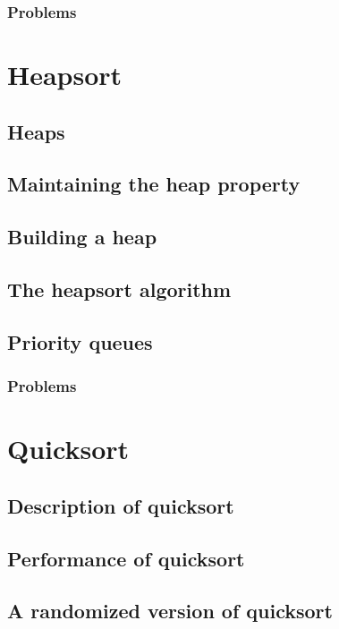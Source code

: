 \documentclass[fontsize=12pt,paper=a4,open=any]{book}
\begin{document}
\subsection*{Problems}


\chapter{Heapsort}

\section{Heaps}

\section{Maintaining the heap property}

\section{Building a heap}

\section{The heapsort algorithm}

\section{Priority queues}

\subsection*{Problems}


\chapter{Quicksort}

\section{Description of quicksort}

\section{Performance of quicksort}

\section{A randomized version of quicksort}
\end{document}
